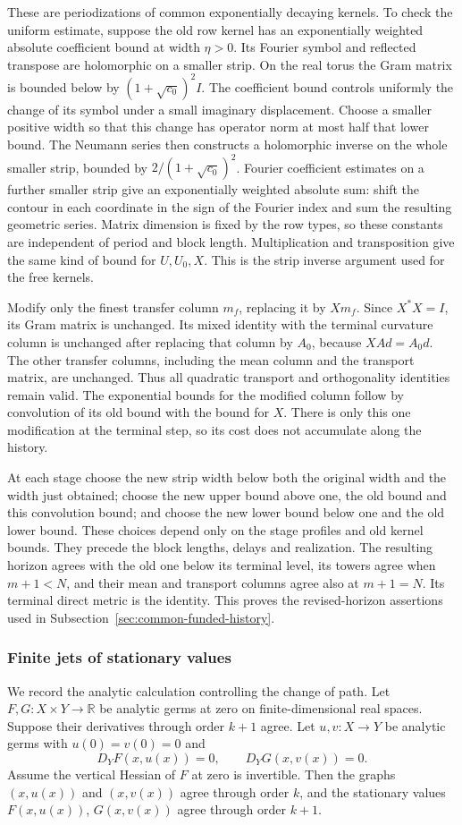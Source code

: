 These are periodizations of common exponentially decaying kernels.
To check the uniform estimate, suppose the old row kernel has an
exponentially weighted absolute coefficient bound at width $\eta>0$.
Its Fourier symbol and reflected transpose are holomorphic on a
smaller strip. On the real torus the Gram matrix is bounded below
by $(1+\sqrt{c_0})^2I$. The coefficient bound controls uniformly
the change of its symbol under a small imaginary displacement.
Choose a smaller positive width so that this change has operator
norm at most half that lower bound. The Neumann series then
constructs a holomorphic inverse on the whole smaller strip,
bounded by $2/(1+\sqrt{c_0})^2$. Fourier coefficient estimates on
a further smaller strip give an exponentially weighted absolute
sum: shift the contour in each coordinate in the sign of the
Fourier index and sum the resulting geometric series. Matrix
dimension is fixed by the row types, so these constants are
independent of period and block length. Multiplication and
transposition give the same kind of bound for $U,U_0,X$.
This is the strip inverse argument used for the free kernels.

Modify only the finest transfer column $m_f$, replacing it by
$Xm_f$. Since $X^*X=I$, its Gram matrix is unchanged. Its mixed
identity with the terminal curvature column is unchanged after
replacing that column by $A_0$, because $XAd=A_0d$.
The other transfer columns, including the mean column and the
transport matrix, are unchanged. Thus all quadratic transport and
orthogonality identities remain valid. The exponential bounds for
the modified column follow by convolution of its old bound with
the bound for $X$. There is only this one modification at the
terminal step, so its cost does not accumulate along the history.

At each stage choose the new strip width below both the original
width and the width just obtained; choose the new upper bound above
one, the old bound and this convolution bound; and choose the new
lower bound below one and the old lower bound. These choices depend
only on the stage profiles and old kernel bounds. They precede the
block lengths, delays and realization. The resulting horizon agrees
with the old one below its terminal level, its towers agree when
$m+1<N$, and their mean and transport columns agree also at
$m+1=N$. Its terminal direct metric is the identity. This proves
the revised-horizon assertions used in
Subsection~\ref{sec:common-funded-history}.

\subsubsection{Finite jets of stationary values}
We record the analytic calculation controlling the change of path.
Let $F,G:X\times Y\to\mathbb R$ be analytic germs at zero on
finite-dimensional real spaces. Suppose their derivatives through
order $k+1$ agree. Let $u,v:X\to Y$ be analytic germs with
$u(0)=v(0)=0$ and
\[
 D_YF(x,u(x))=0,\qquad D_YG(x,v(x))=0.
\]
Assume the vertical Hessian of $F$ at zero is invertible.
Then the graphs $(x,u(x))$ and $(x,v(x))$ agree through order $k$,
and the stationary values $F(x,u(x))$, $G(x,v(x))$ agree through
order $k+1$.

